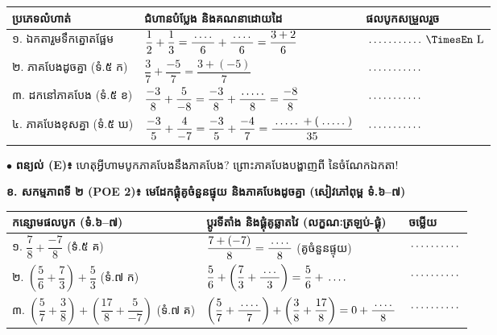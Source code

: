 \documentclass[a4paper,10pt]{article}
\newcommand{\en}[1]{{\TimesEn #1}}
\newcommand{\unit}[1]{\,\text{\en{#1}}}
\newcommand{\blank}[1][1.5cm]{\makebox[#1]{\dotfill}}
\begin{document}
{\renewcommand{\arraystretch}{1.64}
\begin{tabular}{|L{4.80cm}|L{8.70cm}|C{4.30cm}|}
  \hline
  \textbf{ប្រភេទលំហាត់} & \textbf{ជំហានបំប្លែង និងគណនាដោយដៃ} & \textbf{ផលបូកសម្រួលរួច} \\
  \hline
  ១. ឯកតារួមទឹកត្នោតផ្អែម & $\dfrac{1}{2} + \dfrac{1}{3} = \dfrac{\blank[0.7cm]}{6} + \dfrac{\blank[0.7cm]}{6} = \dfrac{3+2}{6}$ & $\blank[1.8cm]\unit{L}$ \\
  \hline
  ២. ភាគបែងដូចគ្នា (ទំ.៥ ក) & $\dfrac{3}{7} + \dfrac{-5}{7} = \dfrac{3 + (-5)}{7}$ & $\blank[1.8cm]$ \\
  \hline
  ៣. ដកនៅភាគបែង (ទំ.៥ ខ) & $\dfrac{-3}{8} + \dfrac{5}{-8} = \dfrac{-3}{8} + \dfrac{\blank[0.8cm]}{8} = \dfrac{-8}{8}$ & $\blank[1.8cm]$ \\
  \hline
  ៤. ភាគបែងខុសគ្នា (ទំ.៥ ឃ) & $\dfrac{-3}{5} + \dfrac{4}{-7} = \dfrac{-3}{5} + \dfrac{-4}{7} = \dfrac{\blank[0.9cm] + (\blank[0.9cm])}{35}$ & $\blank[1.8cm]$ \\
  \hline
\end{tabular}}

\vspace{5pt}
$\bullet$ \textbf{ពន្យល់ (\en{E})៖} ហេតុអ្វីហាមបូកភាគបែងនឹងភាគបែង? ព្រោះភាគបែងបង្ហាញពី \blank[2.8cm] នៃចំណែកឯកតា!

\vspace{6pt}
\textbf{ខ. សកម្មភាពទី ២ (\en{POE 2})៖ មេដែកផ្គុំគូចំនួនផ្ទុយ និងភាគបែងដូចគ្នា (សៀវភៅពុម្ព ទំ.៦–៧)}

{\renewcommand{\arraystretch}{1.60}
\begin{tabular}{|L{5.60cm}|L{8.40cm}|C{3.80cm}|}
  \hline
  \textbf{កន្សោមផលបូក (ទំ.៦–៧)} & \textbf{ប្ដូរទីតាំង និងផ្គុំគូឆ្លាតវៃ (លក្ខណៈត្រឡប់-ផ្គុំ)} & \textbf{ចម្លើយ} \\
  \hline
  ១. $\dfrac{7}{8} + \dfrac{-7}{8}$ (ទំ.៥ គ) & $\dfrac{7 + (-7)}{8} = \dfrac{\blank[0.7cm]}{8}$ (គូចំនួនផ្ទុយ) & $\blank[1.6cm]$ \\
  \hline
  ២. $\left(\dfrac{5}{6} + \dfrac{7}{3}\right) + \dfrac{5}{3}$ (ទំ.៧ ក) & $\dfrac{5}{6} + \left(\dfrac{7}{3} + \dfrac{\blank[0.6cm]}{3}\right) = \dfrac{5}{6} + \blank[0.7cm]$ & $\blank[1.6cm]$ \\
  \hline
  ៣. $\left(\dfrac{5}{7} + \dfrac{3}{8}\right) + \left(\dfrac{17}{8} + \dfrac{5}{-7}\right)$ (ទំ.៧ គ) & $\left(\dfrac{5}{7} + \dfrac{\blank[0.7cm]}{7}\right) + \left(\dfrac{3}{8} + \dfrac{17}{8}\right) = 0 + \dfrac{\blank[0.7cm]}{8}$ & $\blank[1.6cm]$ \\
  \hline
\end{tabular}}
\end{document}
